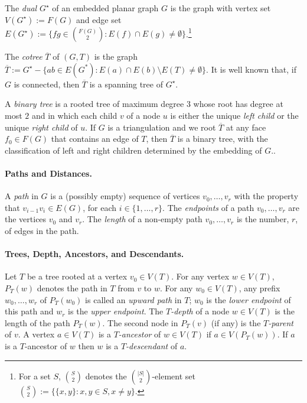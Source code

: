 \documentclass{patmorin}
\DeclareMathOperator{\dist}{dist}
\begin{document}
The \emph{dual} $G^\star$ of an embedded planar graph $G$ is the graph with vertex set $V(G^\star):=F(G)$ and edge set $E(G^{\star}):=\{fg\in \binom{F(G)}{2}:E(f)\cap E(g)\neq\emptyset\}$.\footnote{For a set $S$, $\binom{S}{2}$ denotes the $\binom{|S|}{2}$-element set $\binom{S}{2}:=\{\{x,y\}:x,y\in S, x\neq y\}$.}

The \emph{cotree} $\overline{T}$ of $(G,T)$ is the graph $\overline{T}:=G^\star-\{ab\in E(G^*):E(a)\cap E(b)\setminus E(T)\neq\emptyset\}$.  It is well known that, if $G$ is connected, then $\overline{T}$ is a spanning tree of $G^\star$.

A \emph{binary tree} is a rooted tree of maximum degree $3$ whose root has degree at most $2$ and in which each child $v$ of a node $u$ is either the unique \emph{left child} or the unique \emph{right child} of $u$.  If $G$ is a triangulation  and we root $\overline{T}$ at any face $f_0\in F(G)$ that contains an edge of $T$, then $\overline{T}$ is a binary tree, with the classification of left and right children determined by the embedding of $G$..

\paragraph{Paths and Distances.}

A \emph{path} in $G$ is a (possibly empty) sequence of vertices $v_0,\ldots,v_r$ with the property that $v_{i-1}v_i\in E(G)$, for each $i\in\{1,\ldots,r\}$.  The \emph{endpoints} of a path $v_0,\ldots,v_r$ are the vertices $v_0$ and $v_r$.
The \emph{length} of a non-empty path $v_0,\ldots,v_r$ is the number, $r$, of edges in the path.
%

\paragraph{Trees, Depth, Ancestors, and Descendants.}

Let $T$ be a tree rooted at a vertex $v_0\in V(T)$.  For any vertex $w\in V(T)$, $P_T(w)$ denotes the path in $T$ from $v$ to $w$.  For any $w_0\in V(T)$, any prefix $w_0,\ldots,w_r$ of $P_T(w_0)$ is called an \emph{upward path} in $T$; $w_0$ is the \emph{lower endpoint} of this path and $w_r$ is the \emph{upper endpoint}.  The \emph{$T$-depth} of a node $w\in V(T)$ is the length of the path $P_T(w)$. The second node in $P_T(v)$ (if any) is the \emph{$T$-parent} of $v$.  A vertex $a\in V(T)$ is a \emph{$T$-ancestor} of $w\in V(T)$ if $a\in V(P_T(w))$. If $a$ is a $T$-ancestor of $w$ then $w$ is a \emph{$T$-descendant} of $a$.
\end{document}
